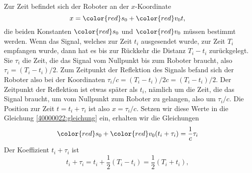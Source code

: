 \begin{loesung}
\begin{figure}
\centering
{}
\end{figure}
Zur Zeit befindet sich der Roboter an der $x$-Koordinate
\begin{equation}
x = {\color{red}s_0} + {\color{red}v_0}t,
\label{40000022:gleichung}
\end{equation}
die beiden Konstanten
$\color{red}s_0$
und
$\color{red}v_0$
müssen bestimmt werden.
Wenn das Signal, welches zur Zeit $t_i$ ausgesendet wurde, zur Zeit $T_i$
empfangen wurde, dann hat es bis zur Rückkehr die Distanz $T_i-t_i$
zurückgelegt.
Sie $\tau_i$ die Zeit, die das Signal vom Nullpunkt bis zum Roboter
braucht, also $\tau_i = (T_i-t_i)/2$.
Zum Zeitpunkt der Reflektion des Signals befand sich der Roboter also bei
der Koordinaten $\tau_i/c=(T_i - t_i)/2c=(T_i-t_i)/2$.
Der Zeitpunkt der Reflektion ist etwas später als $t_i$, nämlich
um die Zeit, die das Signal braucht, um vom Nullpunkt zum Roboter
zu gelangen, also um $\tau_i/c$.
Die Position zur Zeit $t=t_i + \tau_i$ ist also $x=\tau_i/c$.
Setzen wir diese Werte in die Gleichung
\eqref{40000022:gleichung}
ein, erhalten wir die Gleichungen
\begin{equation}
{\color{red}s_0} + {\color{red}v_0}(t_i+\tau_i) = \frac1c\tau_i
\label{40000022:glsys}
\end{equation}
Der Koeffizient $t_i+\tau_i$ ist
\[
t_i+\tau_i = t_i + \frac12(T_i-t_i)=\frac12(T_i+t_i),
\]
\end{loesung}
